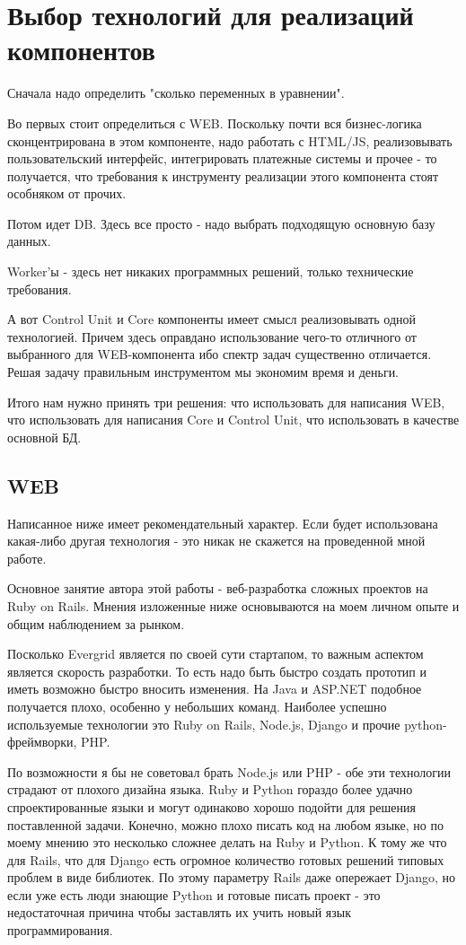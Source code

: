 \section{Выбор технологий для реализаций компонентов}

Сначала надо определить "сколько переменных в уравнении".

Во первых стоит определиться с WEB. Поскольку почти вся бизнес-логика сконцентрирована в этом компоненте, надо работать с HTML/JS, реализовывать пользовательский интерфейс, интегрировать платежные системы и прочее - то получается, что требования к инструменту реализации этого компонента стоят особняком от прочих.

Потом идет DB. Здесь все просто - надо выбрать подходящую основную базу данных.

Worker'ы - здесь нет никаких программных решений, только технические требования.

А вот Control Unit и Core компоненты имеет смысл реализовывать одной технологией. Причем здесь оправдано использование чего-то отличного от выбранного для WEB-компонента ибо спектр задач существенно отличается. Решая задачу правильным инструментом мы экономим время и деньги.

Итого нам нужно принять три решения: что использовать для написания WEB, что использовать для написания Core и Control Unit, что использовать в качестве основной БД.

\subsection{WEB}

Написанное ниже имеет рекомендательный характер. Если будет использована какая-либо другая технология - это никак не скажется на проведенной мной работе.

Основное занятие автора этой работы - веб-разработка сложных проектов на Ruby on Rails. Мнения изложенные ниже основываются на моем личном опыте и общим наблюдением за рынком.

Посколько Evergrid является по своей сути стартапом, то важным аспектом является скорость разработки. То есть надо быть быстро создать прототип и иметь возможно быстро вносить изменения. На Java и ASP.NET подобное получается плохо, особенно у небольших команд. Наиболее успешно используемые технологии это Ruby on Rails, Node.js, Django и прочие python-фреймворки, PHP.

По возможности я бы не советовал брать Node.js или PHP - обе эти технологии страдают от плохого дизайна языка. Ruby и Python гораздо более удачно спроектированные языки и могут одинаково хорошо подойти для решения поставленной задачи. Конечно, можно плохо писать код на любом языке, но по моему мнению это несколько сложнее делать на Ruby и Python. К тому же что для Rails, что для Django есть огромное количество готовых решений типовых проблем в виде библиотек. По этому параметру Rails даже опережает Django, но если уже есть люди знающие Python и готовые писать проект - это недостаточная причина чтобы заставлять их учить новый язык программирования.

